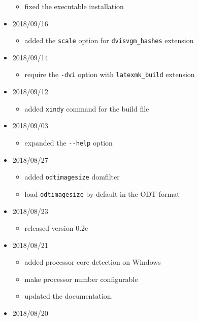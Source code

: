 \begin{itemize}
  \begin{itemize}
  \tightlist
  \item
    fixed the executable installation
  \end{itemize}
\item
  2018/09/16

  \begin{itemize}
  \tightlist
  \item
    added the \texttt{scale} option for \texttt{dvisvgm\_hashes}
    extension
  \end{itemize}
\item
  2018/09/14

  \begin{itemize}
  \tightlist
  \item
    require the \texttt{-dvi} option with \texttt{latexmk\_build}
    extension
  \end{itemize}
\item
  2018/09/12

  \begin{itemize}
  \tightlist
  \item
    added \texttt{xindy} command for the build file
  \end{itemize}
\item
  2018/09/03

  \begin{itemize}
  \tightlist
  \item
    expanded the \texttt{-\/-help} option
  \end{itemize}
\item
  2018/08/27

  \begin{itemize}
  \tightlist
  \item
    added \texttt{odtimagesize} domfilter
  \item
    load \texttt{odtimagesize} by default in the ODT format
  \end{itemize}
\item
  2018/08/23

  \begin{itemize}
  \tightlist
  \item
    released version 0.2c
  \end{itemize}
\item
  2018/08/21

  \begin{itemize}
  \tightlist
  \item
    added processor core detection on Windows
  \item
    make processor number configurable
  \item
    updated the documentation.
  \end{itemize}
\item
  2018/08/20


\end{itemize}
